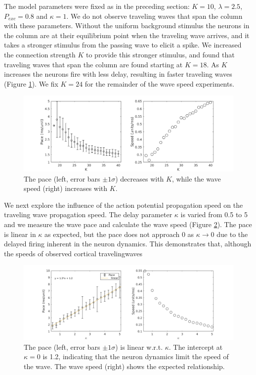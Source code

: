 \documentclass[a4paper,11pt]{article}
\begin{document}
The model parameters were fixed as in the preceding section: $K=10$, $\lambda=2.5$, $P_{exc}=0.8$ and $\kappa=1$.
We do not observe traveling waves that span the column with these parameters.
Without the uniform background stimulus the neurons in the column are at their equilibrium point when the traveling wave arrives, and it takes a stronger stimulus from the passing wave to elicit a spike.
We increased the connection strength $K$ to provide this stronger stimulus, and found that traveling waves that span the column are found starting at $K=18$. 
As $K$ increases the neurons fire with less delay, resulting in faster traveling waves (Figure \ref{fig:delay_k}).
We fix $K=24$ for the remainder of the wave speed experiments.
\begin{figure}[!htb]
 \caption{The pace (left, error bars $\pm 1 \sigma$) decreases with $K$, while the wave speed (right) increases with $K$. }
 \label{fig:delay_k}
 \centering
   \includegraphics[width=\textwidth]{fig/WaveSpeed_K}
\end{figure}

We next explore the influence of the action potential propagation speed on the traveling wave propagation speed.
The delay parameter $\kappa$ is varied from 0.5 to 5 and we measure the wave pace and calculate the wave speed (Figure \ref{fig:delay_speed}).
The pace is linear in $\kappa$ as expected, but the pace does not approach $0$ as $\kappa \rightarrow 0$ due to the delayed firing inherent in the neuron dynamics.
This demonstrates that, although the speeds of observed cortical travelingwaves
\begin{figure}[!htb]
 \caption{The pace (left, error bars $\pm 1 \sigma$) is linear w.r.t. $\kappa$. The intercept at $\kappa=0$ is 1.2, indicating that the neuron dynamics limit the speed of the wave. The wave speed (right) shows the expected relationship. }
 \label{fig:delay_speed}
 \centering
   \includegraphics[width=\textwidth]{fig/WaveSpeed_Delay}
\end{figure}
\end{document}
